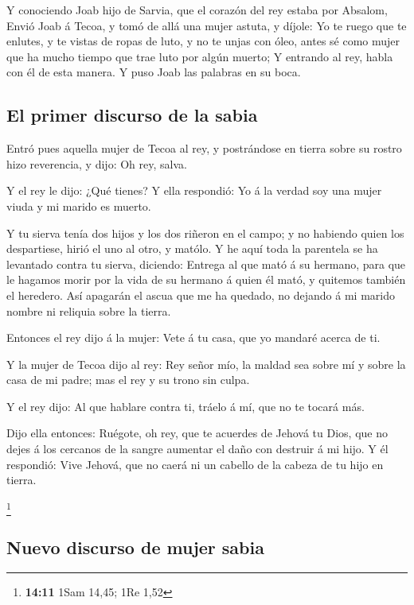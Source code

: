  Y conociendo Joab hijo de Sarvia, que el corazón del rey
estaba por Absalom,  Envió Joab á Tecoa, y tomó de allá
una mujer astuta, y díjole: Yo te ruego que te enlutes, y te vistas de
ropas de luto, y no te unjas con óleo, antes sé como mujer que ha mucho
tiempo que trae luto por algún muerto;  Y entrando al rey,
habla con él de esta manera. Y puso Joab las palabras en su boca.

\hypertarget{el-primer-discurso-de-la-sabia}{%
\subsection{El primer discurso de la
sabia}\label{el-primer-discurso-de-la-sabia}}

 Entró pues aquella mujer de Tecoa al rey, y postrándose
en tierra sobre su rostro hizo reverencia, y dijo: Oh rey, salva.

 Y el rey le dijo: ¿Qué tienes? Y ella respondió: Yo á la
verdad soy una mujer viuda y mi marido es muerto.

 Y tu sierva tenía dos hijos y los dos riñeron en el
campo; y no habiendo quien los despartiese, hirió el uno al otro, y
matólo.  Y he aquí toda la parentela se ha levantado
contra tu sierva, diciendo: Entrega al que mató á su hermano, para que
le hagamos morir por la vida de su hermano á quien él mató, y quitemos
también el heredero. Así apagarán el ascua que me ha quedado, no dejando
á mi marido nombre ni reliquia sobre la tierra.

 Entonces el rey dijo á la mujer: Vete á tu casa, que yo
mandaré acerca de ti.

 Y la mujer de Tecoa dijo al rey: Rey señor mío, la maldad
sea sobre mí y sobre la casa de mi padre; mas el rey y su trono sin
culpa.

 Y el rey dijo: Al que hablare contra ti, tráelo á mí,
que no te tocará más.

 Dijo ella entonces: Ruégote, oh rey, que te acuerdes de
Jehová tu Dios, que no dejes á los cercanos de la sangre aumentar el
daño con destruir á mi hijo. Y él respondió: Vive Jehová, que no caerá
ni un cabello de la cabeza de tu hijo en tierra.

\footnote{\textbf{14:11} 1Sam 14,45; 1Re 1,52}

\hypertarget{nuevo-discurso-de-mujer-sabia}{%
\subsection{Nuevo discurso de mujer
sabia}\label{nuevo-discurso-de-mujer-sabia}}

